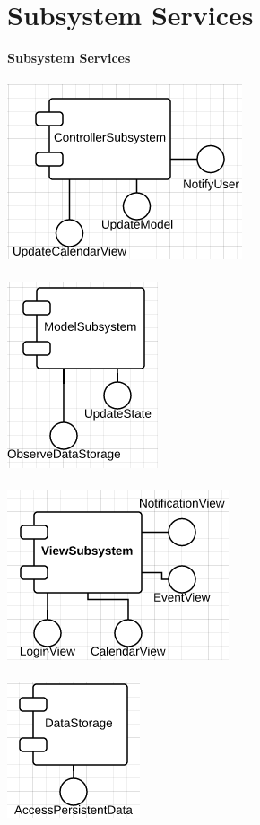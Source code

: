 \chapter{Subsystem Services}
\textbf{Subsystem Services}\\\\
\includegraphics[scale=0.8]{ControllerServices}\\\\
\includegraphics[scale=0.8]{ModelServices}\\\\
\includegraphics[scale=0.8]{ViewServices}\\\\
\includegraphics[scale=0.8]{DatastorageServices}\\\\